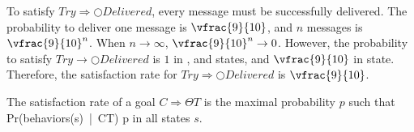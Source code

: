         			To satisfy $Try\Rightarrow\bigcirc Delivered$, every message must be successfully
        			delivered. The probability to deliver one message is $\vfrac{9}{10}$,
        			and $n$ messages is $\vfrac{9}{10}^n$. When
        			$n \rightarrow \infty$, $\vfrac{9}{10}^n \rightarrow 0$. However, the probability
        			to satisfy $Try\rightarrow\bigcirc Delivered$ is $1$ in ,
        			 and  states, and $\vfrac{9}{10}$ in
        			 state. Therefore, the satisfaction rate for $Try\Rightarrow\bigcirc Delivered$
        			is $\vfrac{9}{10}$.
            
            
                      	The satisfaction rate of a goal $C\Rightarrow \Theta T$ 
                       	is the maximal probability $p$ such that
        				\startformula
        					Pr(\lbrace\pi\in behaviors(s)\ |\ \pi\models C\rightarrow \Theta T\rbrace) \geq p
        				\stopformula
        				in all states $s$.
                    \stopdefinition	
            
                    \startexample
                    \stopexample
                    
                    
                    
                    
                    
                    
                    
                    
                    
